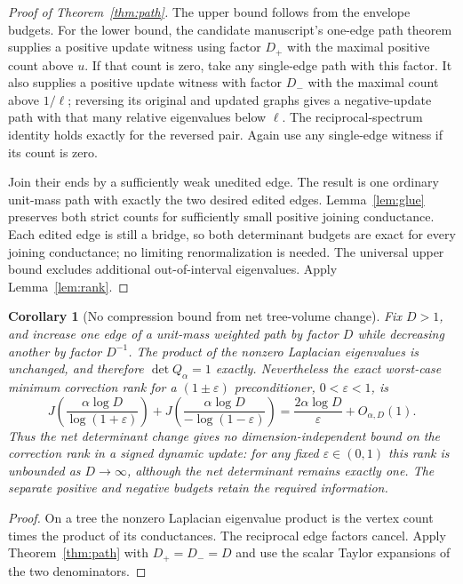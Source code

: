 \documentclass[11pt]{article}
\newtheorem{corollary}[theorem]{Corollary}
\begin{document}
\begin{proof}[Proof of Theorem~\ref{thm:path}]
The upper bound follows from the envelope budgets. For the lower bound,
the candidate manuscript's one-edge path theorem supplies a positive
update witness using factor $D_+$ with the maximal positive count above
$u$. If that count is zero, take any single-edge path with this factor.
It also supplies a positive update witness with factor $D_-$ with the
maximal count above $1/\ell$; reversing its original and updated graphs
gives a negative-update path with that many relative eigenvalues below
$\ell$. The reciprocal-spectrum identity holds exactly for the reversed
pair. Again use any single-edge witness if its count is zero.

Join their ends by a sufficiently weak unedited edge. The result is one
ordinary unit-mass path with exactly the two desired edited edges.
Lemma~\ref{lem:glue} preserves both strict counts for sufficiently small
positive joining conductance. Each edited edge is still a bridge, so
both determinant budgets are exact for every joining conductance; no
limiting renormalization is needed. The universal upper bound excludes
additional out-of-interval eigenvalues. Apply Lemma~\ref{lem:rank}.
\end{proof}

\begin{corollary}[No compression bound from net tree-volume change]
\label{cor:volume}
Fix $D>1$, and increase one edge of a unit-mass weighted path by factor
$D$ while decreasing another by factor $D^{-1}$. The product of the
nonzero Laplacian eigenvalues is unchanged, and therefore
$\det Q_\alpha=1$ exactly. Nevertheless the exact worst-case minimum
correction rank for a $(1\pm\varepsilon)$ preconditioner, $0<\varepsilon<1$,
is
\[
 J\!\left(\frac{\alpha\log D}{\log(1+\varepsilon)}\right)
 +J\!\left(\frac{\alpha\log D}{-\log(1-\varepsilon)}\right)
 =\frac{2\alpha\log D}{\varepsilon}+O_{\alpha,D}(1).
\]
Thus the net determinant change gives no dimension-independent bound on
the correction rank in a signed dynamic update: for any fixed
$\varepsilon\in(0,1)$ this rank is unbounded as $D\to\infty$, although
the net determinant remains exactly one. The separate positive
and negative budgets retain the required information.
\end{corollary}
\begin{proof}
On a tree the nonzero Laplacian eigenvalue product is the vertex count
times the product of its conductances. The reciprocal edge factors cancel.
Apply Theorem~\ref{thm:path} with $D_+=D_-=D$ and use the scalar Taylor
expansions of the two denominators.
\end{proof}
\end{document}
